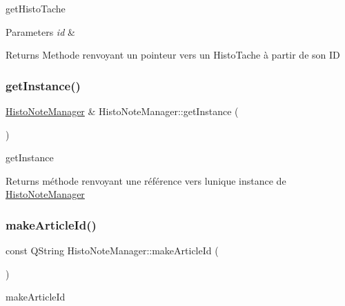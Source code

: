 get\+Histo\+Tache 


\begin{DoxyParams}{Parameters}
{\em id} & \\
\hline
\end{DoxyParams}
\begin{DoxyReturn}{Returns}
Methode renvoyant un pointeur vers un Histo\+Tache à partir de son ID 
\end{DoxyReturn}
\mbox{\label{class_histo_note_manager_a9174873cef82d50e2b2479de6350d945}} 
\subsubsection{\texorpdfstring{get\+Instance()}{getInstance()}}
{\footnotesize\ttfamily \hyperlink{class_histo_note_manager}{Histo\+Note\+Manager} \& Histo\+Note\+Manager\+::get\+Instance (\begin{DoxyParamCaption}{ }\end{DoxyParamCaption})\hspace{0.3cm}{\ttfamily [static]}}



get\+Instance 

\begin{DoxyReturn}{Returns}
méthode renvoyant une référence vers l\textquotesingle{}unique instance de \hyperlink{class_histo_note_manager}{Histo\+Note\+Manager} 
\end{DoxyReturn}
\mbox{\label{class_histo_note_manager_a53f594ce147e634b25047f483704d17f}} 
\subsubsection{\texorpdfstring{make\+Article\+Id()}{makeArticleId()}}
{\footnotesize\ttfamily const Q\+String Histo\+Note\+Manager\+::make\+Article\+Id (\begin{DoxyParamCaption}{ }\end{DoxyParamCaption})}



make\+Article\+Id 

